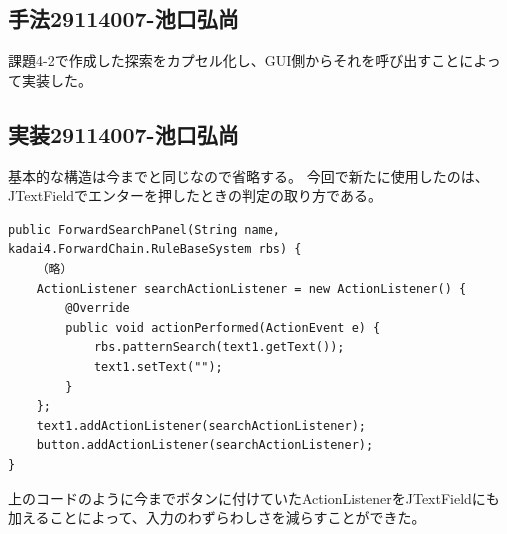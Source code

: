 \documentclass{jarticle}
\begin{document}
\subsection{手法29114007-池口弘尚}
課題4-2で作成した探索をカプセル化し、GUI側からそれを呼び出すことによって実装した。

\subsection{実装29114007-池口弘尚}
基本的な構造は今までと同じなので省略する。
今回で新たに使用したのは、JTextFieldでエンターを押したときの判定の取り方である。

\begin{lstlisting}[caption=JTextFieldのActionListener,label=src:text]
public ForwardSearchPanel(String name, kadai4.ForwardChain.RuleBaseSystem rbs) {
	（略）
	ActionListener searchActionListener = new ActionListener() {
		@Override
		public void actionPerformed(ActionEvent e) {
			rbs.patternSearch(text1.getText());
			text1.setText("");
		}
	};
	text1.addActionListener(searchActionListener);
	button.addActionListener(searchActionListener);
}
\end{lstlisting}
上のコードのように今までボタンに付けていたActionListenerをJTextFieldにも加えることによって、入力のわずらわしさを減らすことができた。
\end{document}
